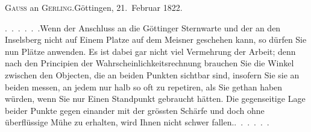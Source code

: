 \begin{center}
\textsc{Gauss} an \textsc{Gerling}.\quad Göttingen, 21.~Februar 1822.
\end{center}

\par\noindent\hspace*{\parindent}\mbox{.\ .\ .\ .\ .\ .}\quad Wenn der Anschluss an die Göttinger Sternwarte und der an den Inselsberg nicht auf Einem Platze auf dem Meisner geschehen kann, so dürfen Sie nun  Plätze anwenden.
Es ist dabei gar nicht viel Vermehrung der Arbeit; denn nach den Principien der Wahrscheinlichkeitsrechnung brauchen Sie die Winkel zwischen den Objecten, die an beiden Punkten sichtbar sind, insofern Sie sie an beiden messen, an jedem nur halb so oft zu repetiren, als Sie gethan haben würden, wenn Sie nur Einen Standpunkt gebraucht hätten.
Die gegenseitige Lage beider Punkte gegen einander mit der grössten Schärfe und doch ohne überflüssige Mühe zu erhalten, wird Ihnen nicht schwer \mbox{fallen.\quad.\ .\ .\ .\ .\ .}
